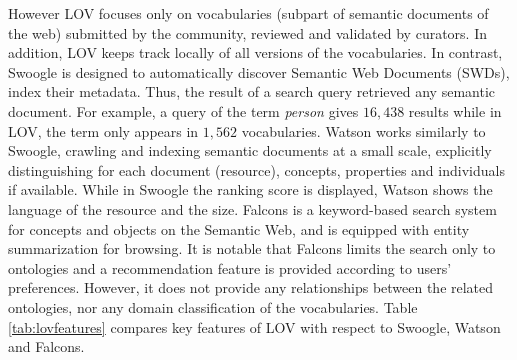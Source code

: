 \documentclass{iosart2c}
\begin{document}
However LOV focuses only on vocabularies (subpart of semantic documents of the web) submitted by the community, reviewed and validated by curators. In addition, LOV keeps track locally of all versions of the vocabularies.  In contrast, Swoogle is designed to automatically discover Semantic Web Documents (SWDs), index their metadata. Thus, the result of a search query retrieved any semantic document. For example, a query of the term \textit{person} gives $16,438$ results while in LOV, the term only appears in $1,562$ vocabularies.
Watson works similarly to Swoogle, crawling and indexing semantic documents at a small scale, explicitly distinguishing for each document (resource), concepts, properties and individuals if available. While in Swoogle  the ranking score is displayed, Watson shows the language of the resource and the size. Falcons is a keyword-based search system for concepts and objects on the Semantic Web, and is equipped with entity summarization for browsing. It is notable that Falcons limits the search only to ontologies and a recommendation feature is provided according to users' preferences. However, it does not provide any relationships between the related ontologies, nor any domain classification of the vocabularies.
Table \ref{tab:lovfeatures} compares key features of LOV with respect to Swoogle, Watson and Falcons.
 \begin{table}[!htb]
\end{table}
\end{document}
